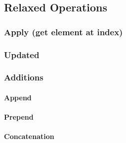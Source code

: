\subsection{Relaxed Operations}


\subsubsection{Apply (get element at index)}



\subsubsection{Updated}


\subsubsection{Additions}

\paragraph{Append}

\paragraph{Prepend}


\paragraph{Concatenation}

